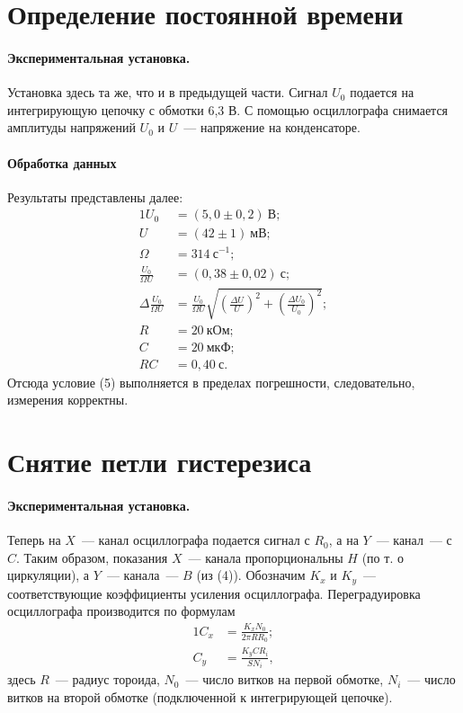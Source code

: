 \documentclass[12pt,a4paper]{article}
\begin{document}
\section{Определение постоянной времени}
\paragraph{Экспериментальная установка.} Установка здесь та же, что и в предыдущей части. Сигнал $U_0$ подается на интегрирующую цепочку с обмотки 6,3 В. С помощью осциллографа снимается амплитуды напряжений $U_0$ и $U$~--- напряжение на конденсаторе.
\paragraph{Обработка данных} Результаты представлены далее:
\newpage
\begin{alignat}{1}
U_0 &= (5,0 \pm 0,2)~\text{В};\\
U &= (42 \pm 1)~\text{мВ};\\
\Omega &= 314~\text{с}^{-1};\\
\frac{U_0}{\Omega U} &= (0,38 \pm 0,02)~\text{с};\\
\Delta \frac{U_0}{\Omega U} &= \frac{U_0}{\Omega U}\sqrt{\left(\frac{\Delta U}{U}\right)^2 + \left(\frac{\Delta U_0}{U_0}\right)^2};\\
R &= 20~\text{кОм};\\
C &= 20~\text{мкФ};\\
RC &= 0,40~\text{с}.
\end{alignat}
Отсюда условие (5) выполняется в пределах погрешности, следовательно, измерения корректны.
\section{Снятие петли гистерезиса}
\paragraph{Экспериментальная установка.} Теперь на $X$~--- канал осциллографа подается сигнал с $R_0$, а на $Y$~--- канал~--- с $C$. Таким образом, показания $X$~--- канала пропорциональны $H$ (по т. о циркуляции), а $Y$~--- канала~--- $B$ (из (4)). Обозначим $K_x$ и $K_y$~--- соответствующие коэффициенты усиления осциллографа. Переградуировка осциллографа производится по формулам
\begin{alignat}{1}
C_x &= \frac{K_xN_0}{2\pi RR_0};\\
C_y &= \frac{K_yCR_i}{SN_i},
\end{alignat}
здесь $R$~--- радиус тороида, $N_0$~--- число витков на первой обмотке, $N_i$~--- число витков на второй обмотке (подключенной к интегрирующей цепочке).
\end{document}
